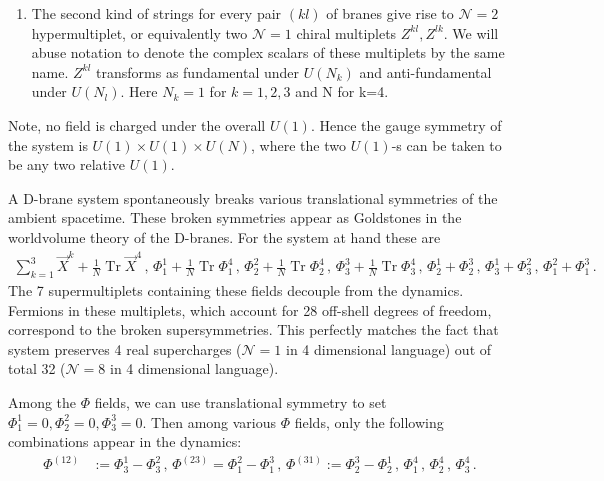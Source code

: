 \documentclass[12pt,a4paper]{JHEP3}
\newcommand{\Tr}{\mathop{\mathrm{Tr}}}
\begin{document}
\begin{enumerate}
\item
The second kind of strings for every pair $(kl)$ of branes  give rise to $\mathcal{N}=2$ hypermultiplet, or equivalently two $\mathcal{N}=1$ chiral multiplets $Z^{kl}, Z^{lk}$. We will abuse notation to denote the complex scalars of these multiplets by the same name. 
$Z^{kl}$ transforms as fundamental under $U(N_k)$ and anti-fundamental under $U(N_l)$. Here $N_k=1$ for $k=1,2,3$ and N for k=4. 
\end{enumerate}
Note, no field is charged under the overall $U(1)$. Hence the gauge symmetry of the system is $U(1) \times U(1) \times U(N)$, where  the two $U(1)$-s can be taken to be any two relative $U(1)$.

A D-brane system spontaneously breaks various translational symmetries of the ambient spacetime. These broken symmetries appear as Goldstones in the worldvolume theory of the D-branes. For the system  at hand these are
\begin{align}
\sum_{k=1}^3 \vec{X}^k + \frac{1}{N} \Tr{} \vec{X}^{4} \, , \, \Phi^1_1 + \frac{1}{N} \Tr{} \Phi^{4}_1  \, , \, \Phi^2_2 + \frac{1}{N} \Tr{} \Phi^{4}_2  \, , \, \Phi^3_3 + \frac{1}{N} \Tr{} \Phi^{4}_3  \, , \, \Phi^1_2 + \Phi^3_2 \, , \, \Phi^1_3 + \Phi^2_3 \, , \, \Phi^2_1 + \Phi^3_1 \, . \label{Goldstone}
\end{align}
The 7 supermultiplets containing these fields decouple from the dynamics. Fermions in these multiplets, which account for 28 off-shell degrees of freedom, correspond to the broken supersymmetries. This perfectly matches the fact that system preserves 4 real supercharges ($\mathcal{N}=1$ in 4 dimensional language) out of total 32 ($\mathcal{N}=8$ in 4 dimensional language).

Among the $\Phi$ fields, we can use translational symmetry to set $\Phi^1_1 = 0, \Phi^2_2 = 0, \Phi^3_3 = 0$. Then among various $\Phi$ fields, only the following combinations appear in the dynamics:\\
\begin{align}
\Phi^{(12)} &:= \Phi^1_3 - \Phi^2_3 \, , \, \Phi^{(23)}  = \Phi^2_1 - \Phi^3_1 \, , \, \Phi^{(31)} :=  \Phi^3_2 - \Phi^1_2 \, , \,  \Phi^{4}_1 \, , \, \Phi^{4}_2 \, , \, \Phi^{4}_3 \, . \label{phisurvive}
\end{align}

\end{document}
